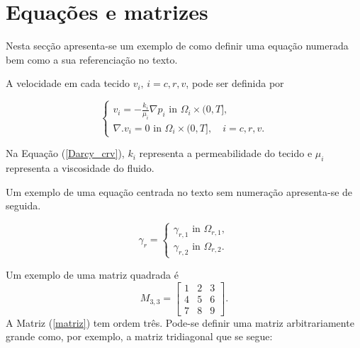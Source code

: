 \section{Equações e matrizes}
    \label{cap2:sec_equa}
    
    Nesta secção apresenta-se um exemplo de como definir uma equação numerada bem como a sua referenciação no texto.
    
    A velocidade em cada tecido $v_i,\, i=c,r,v$, pode ser definida por
    
    \begin{equation} 
        \label{Darcy_crv}
        \left\{
        \begin{array}{l}
            v_i=-\frac{k_i}{\mu_i}\nabla p_i \mbox{ in } \Omega_i\times (0,T],\\
            \nabla. v_i=0 \mbox{ in } \Omega_i\times (0,T], \quad i=c,r,v.
        \end{array}
        \right.
    \end{equation}
    
    Na Equação (\ref{Darcy_crv}), $k_i$ representa a permeabilidade do tecido e $\mu_i$ representa a viscosidade do fluido. 
    
    Um exemplo de uma equação centrada no texto sem numeração apresenta-se de seguida.
    
    $$ \gamma_r=\left\{
        \begin{array}{l}
            \gamma_{r,1}  \mbox{ in } \Omega_{r,1},\\
            \gamma_{r,2}  \mbox{ in } \Omega_{r,2}.
        \end{array}
        \right. $$
    
    Um exemplo de uma matriz quadrada é
        \begin{equation}
        M_{3,3}=\left[ \begin{array}{ccc}
                  1&2&3\\
                  4&5&6\\
                  7&8&9
                \end{array}
            \right].\label{matriz}
        \end{equation}     
    A Matriz (\ref{matriz}) tem ordem três. Pode-se  definir uma matriz arbitrariamente grande como, por exemplo, a matriz tridiagonal que se segue:
    

